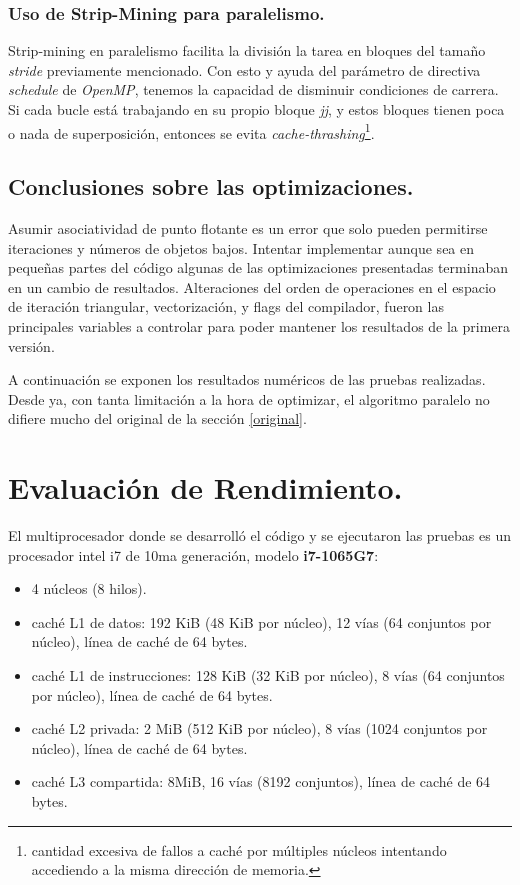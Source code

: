 \documentclass{article}
\begin{document}
\subsubsection{Uso de Strip-Mining para paralelismo.\label{strip-mining-parallel}}
Strip-mining en paralelismo facilita la división la tarea en bloques del tamaño \textit{stride}
previamente mencionado. Con esto y ayuda del parámetro de directiva \textit{schedule} de \textit{OpenMP},
tenemos la capacidad de disminuir condiciones de carrera. Si cada bucle está trabajando en su propio bloque
\textit{jj}, y estos bloques tienen poca o nada de superposición, entonces se evita
\textit{cache-thrashing}\footnote{cantidad excesiva de fallos a caché por múltiples núcleos intentando accediendo
a la misma dirección de memoria.}.


\subsection{Conclusiones sobre las optimizaciones.}
Asumir asociatividad de punto flotante es un error que solo pueden permitirse iteraciones
y números de objetos bajos. Intentar implementar aunque sea en pequeñas partes del código algunas de
las optimizaciones presentadas terminaban en un cambio de resultados. Alteraciones del orden de operaciones
en el espacio de iteración triangular, vectorización, y flags del compilador, fueron las principales
variables a controlar para poder mantener los resultados de la primera versión.


A continuación se exponen los resultados numéricos de las pruebas realizadas.
Desde ya, con tanta limitación a la hora de optimizar, el algoritmo paralelo no difiere mucho del
original de la sección \ref{original}.

\section{Evaluación de Rendimiento.\label{performance}}
El multiprocesador donde se desarrolló el código y se ejecutaron las pruebas es un
procesador intel i7 de 10ma generación, modelo \textbf{i7-1065G7}:
\begin{itemize}
	\item 4 núcleos (8 hilos).
	\item caché L1 de datos: 192 KiB (48 KiB por núcleo), 12 vías (64 conjuntos por núcleo), línea de caché de 64 bytes.
	\item caché L1 de instrucciones: 128 KiB (32 KiB por núcleo), 8 vías (64 conjuntos por núcleo), línea de caché de 64 bytes.
	\item caché L2 privada: 2 MiB (512 KiB por núcleo), 8 vías (1024 conjuntos por núcleo), línea de caché de 64 bytes.
	\item caché L3 compartida: 8MiB, 16 vías (8192 conjuntos), línea de caché de 64 bytes.
\end{itemize}
\end{document}
